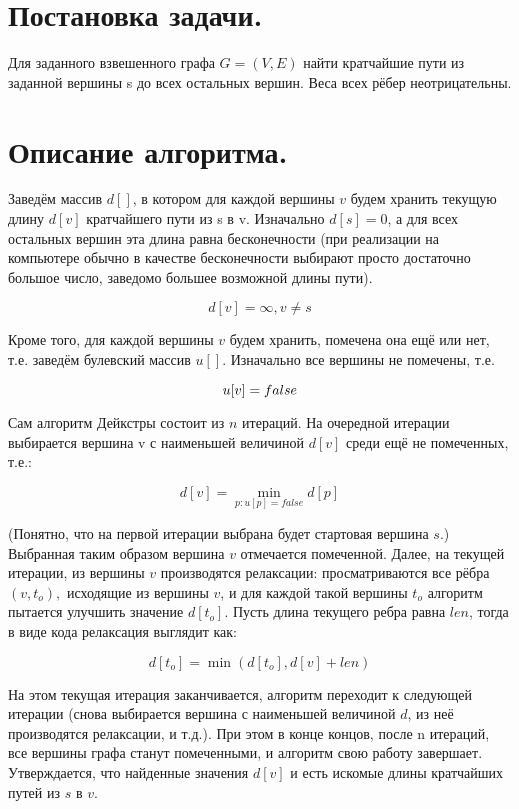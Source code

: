 \documentclass[12pt,a4paper]{scrartcl}
\begin{document}


\newpage
\section{Постановка задачи.}

 Для заданного взвешенного графа $G=(V,E)$ найти кратчайшие пути из заданной вершины s до всех остальных вершин. Веса всех рёбер неотрицательны.
\section{Описание алгоритма.}
Заведём массив $d[]$, в котором для каждой вершины $v$ будем хранить текущую длину $d[v]$ кратчайшего пути из s в v. Изначально $d[s]=0$, а для всех остальных вершин эта длина равна бесконечности (при реализации на компьютере обычно в качестве бесконечности выбирают просто достаточно большое число, заведомо большее возможной длины пути).

\[
    d[v]=\infty, v\not=s 
\]

Кроме того, для каждой вершины $v$ будем хранить, помечена она ещё или нет, т.е. заведём булевский массив $u[]$. Изначально все вершины не помечены, т.е.

\[
    u[v]=false \\
\]

Сам алгоритм Дейкстры состоит из $n$ итераций. На очередной итерации выбирается вершина v с наименьшей величиной $d[v]$ среди ещё не помеченных, т.е.:

\[
    d[v]=\min_{p: u[p]=false} d[p] 
\]

(Понятно, что на первой итерации выбрана будет стартовая вершина $s$.) \\
Выбранная таким образом вершина $v$ отмечается помеченной. Далее, на текущей итерации, из вершины $v$ производятся релаксации: просматриваются все рёбра $(v,t_o),$ исходящие из вершины $v$, и для каждой такой вершины $t_o$ алгоритм пытается улучшить значение $d[t_o]$. Пусть длина текущего ребра равна $len$, тогда в виде кода релаксация выглядит как:

\[
 d[t_o] = \min (d[t_o], d[v] + {len}) 
\]

На этом текущая итерация заканчивается, алгоритм переходит к следующей итерации (снова выбирается вершина с наименьшей величиной $d$, из неё производятся релаксации, и т.д.). При этом в конце концов, после n итераций, все вершины графа станут помеченными, и алгоритм свою работу завершает. Утверждается, что найденные значения $d[v]$ и есть искомые длины кратчайших путей из $s$ в $v$. 
\end{document}
